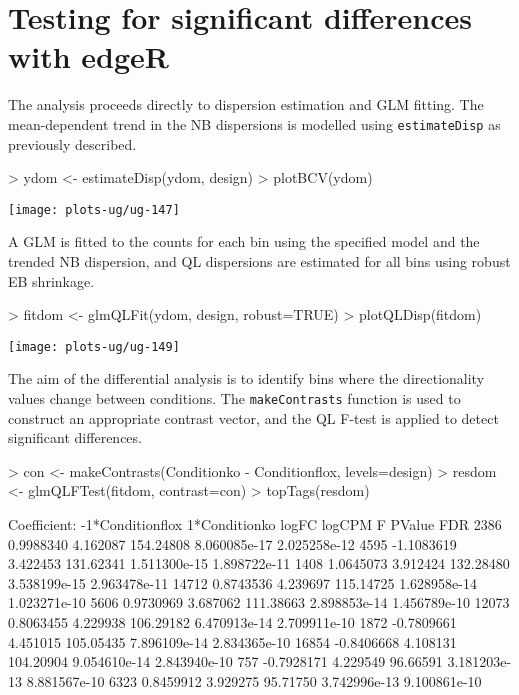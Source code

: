 \documentclass[12pt]{report}
\renewenvironment{Schunk}{\vspace{0pt}}{\vspace{0pt}}
\newcommand{\edgeR}{edgeR}
\newcommand{\code}[1]{{\small\texttt{#1}}}
\begin{document}
\section{Testing for significant differences with \edgeR{}}
The analysis proceeds directly to dispersion estimation and GLM fitting.
The mean-dependent trend in the NB dispersions is modelled using \code{estimateDisp} as previously described.

\begin{Schunk}
\begin{Sinput}
> ydom <- estimateDisp(ydom, design)
> plotBCV(ydom)
\end{Sinput}
\end{Schunk}

\begin{center}
\texttt{[image: plots-ug/ug-147]}
\end{center}

A GLM is fitted to the counts for each bin using the specified model and the trended NB dispersion, and QL dispersions are estimated for all bins using robust EB shrinkage.

\begin{Schunk}
\begin{Sinput}
> fitdom <- glmQLFit(ydom, design, robust=TRUE)
> plotQLDisp(fitdom)
\end{Sinput}
\end{Schunk}

\begin{center}
\texttt{[image: plots-ug/ug-149]}
\end{center}


The aim of the differential analysis is to identify bins where the directionality values change between conditions.
The \code{makeContrasts} function is used to construct an appropriate contrast vector, and the QL F-test is applied to detect significant differences.

\begin{Schunk}
\begin{Sinput}
> con <- makeContrasts(Conditionko - Conditionflox, levels=design)
> resdom <- glmQLFTest(fitdom, contrast=con)
> topTags(resdom)
\end{Sinput}
\begin{Soutput}
Coefficient:  -1*Conditionflox 1*Conditionko 
           logFC   logCPM         F       PValue          FDR
2386   0.9988340 4.162087 154.24808 8.060085e-17 2.025258e-12
4595  -1.1083619 3.422453 131.62341 1.511300e-15 1.898722e-11
1408   1.0645073 3.912424 132.28480 3.538199e-15 2.963478e-11
14712  0.8743536 4.239697 115.14725 1.628958e-14 1.023271e-10
5606   0.9730969 3.687062 111.38663 2.898853e-14 1.456789e-10
12073  0.8063455 4.229938 106.29182 6.470913e-14 2.709911e-10
1872  -0.7809661 4.451015 105.05435 7.896109e-14 2.834365e-10
16854 -0.8406668 4.108131 104.20904 9.054610e-14 2.843940e-10
757   -0.7928171 4.229549  96.66591 3.181203e-13 8.881567e-10
6323   0.8459912 3.929275  95.71750 3.742996e-13 9.100861e-10
\end{Soutput}
\end{Schunk}
\end{document}
